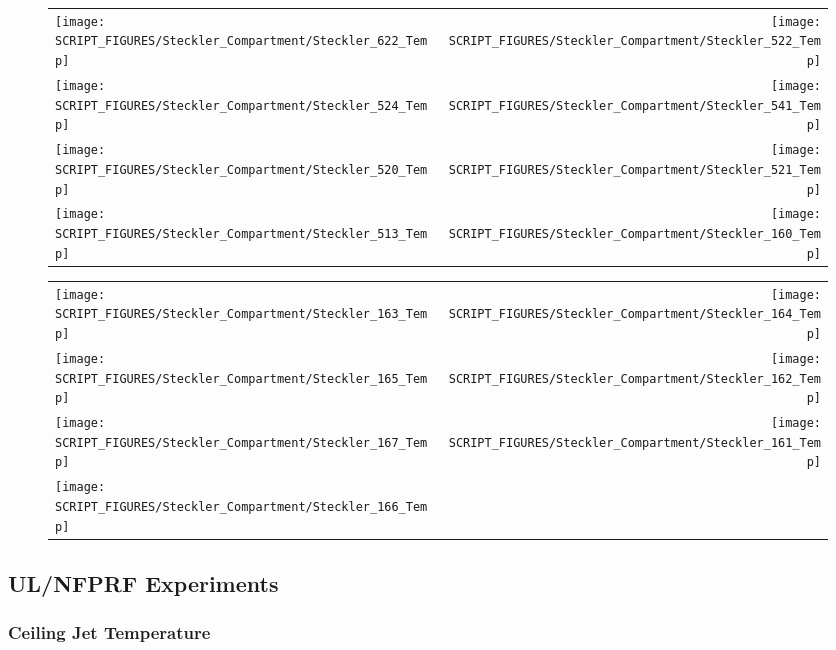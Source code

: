 \begin{figure}[!ht]
\begin{tabular*}{\textwidth}{l@{\extracolsep{\fill}}r}
\texttt{[image: SCRIPT\_FIGURES/Steckler\_Compartment/Steckler\_622\_Temp]} &
\texttt{[image: SCRIPT\_FIGURES/Steckler\_Compartment/Steckler\_522\_Temp]} \\
\texttt{[image: SCRIPT\_FIGURES/Steckler\_Compartment/Steckler\_524\_Temp]} &
\texttt{[image: SCRIPT\_FIGURES/Steckler\_Compartment/Steckler\_541\_Temp]} \\
\texttt{[image: SCRIPT\_FIGURES/Steckler\_Compartment/Steckler\_520\_Temp]} &
\texttt{[image: SCRIPT\_FIGURES/Steckler\_Compartment/Steckler\_521\_Temp]} \\
\texttt{[image: SCRIPT\_FIGURES/Steckler\_Compartment/Steckler\_513\_Temp]} &
\texttt{[image: SCRIPT\_FIGURES/Steckler\_Compartment/Steckler\_160\_Temp]}
\end{tabular*}
\end{figure}

\begin{figure}[!ht]
\begin{tabular*}{\textwidth}{l@{\extracolsep{\fill}}r}
\texttt{[image: SCRIPT\_FIGURES/Steckler\_Compartment/Steckler\_163\_Temp]} &
\texttt{[image: SCRIPT\_FIGURES/Steckler\_Compartment/Steckler\_164\_Temp]} \\
\texttt{[image: SCRIPT\_FIGURES/Steckler\_Compartment/Steckler\_165\_Temp]} &
\texttt{[image: SCRIPT\_FIGURES/Steckler\_Compartment/Steckler\_162\_Temp]} \\
\texttt{[image: SCRIPT\_FIGURES/Steckler\_Compartment/Steckler\_167\_Temp]} &
\texttt{[image: SCRIPT\_FIGURES/Steckler\_Compartment/Steckler\_161\_Temp]} \\
\texttt{[image: SCRIPT\_FIGURES/Steckler\_Compartment/Steckler\_166\_Temp]}
\end{tabular*}
\end{figure}

\clearpage

\subsection{UL/NFPRF Experiments}

\subsubsection{Ceiling Jet Temperature}

